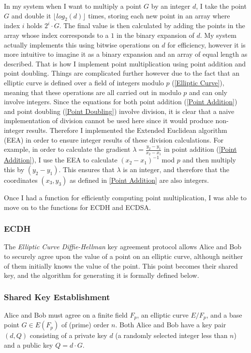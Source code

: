 \documentclass[12pt,a4paper]{article}
\begin{document}
In my system when I want to multiply a point $G$ by an integer $d$, 
I take the point $G$ and double it $\lfloor log_2(d) \rfloor$ times, storing each new point in an array where index $i$ holds $2^i \cdot G$. 
The final value is then calculated by adding the points in the array whose index corresponds to a $1$ in the binary expansion of $d$. 
My system actually implements this using bitwise operations on $d$ for efficiency, 
however it is more intuitive to imagine it as a binary expansion and an array of equal length as described. 
That is how I implement point multiplication using point addition and point doubling. 
Things are complicated further however due to the fact that an elliptic curve is defined over a field of integers modulo $p$ (\ref{Elliptic Curve}), 
meaning that these operations are all carried out in modulo $p$ and can only involve integers. 
Since the equations for both point addition (\ref{Point Addition}) and point doubling (\ref{Point Doubling}) involve division, 
it is clear that a naive implementation of division cannot be used here since it would produce non-integer results. 
Therefore I implemented the Extended Euclidean algorithm (EEA) in order to ensure integer results of these division calculations. 
For example, in order to calculate the gradient $\lambda = \frac{y_2-y_1}{x_2-x_1}$ in point addition (\ref{Point Addition}), 
I use the EEA to calculate $(x_2-x_1)^{-1}$ mod $p$ and then multiply this by $(y_2-y_1)$. 
This ensures that $\lambda$ is an integer, and therefore that the coordinates $(x_3,y_3)$ as defined in \ref{Point Addition} 
are also integers. 

Once I had a function for efficiently computing point multiplication, I was able to move on to the functions for ECDH and ECDSA. 

\subsubsection{ECDH} \noindent \label{ECDH}
The \emph{Elliptic Curve Diffie-Hellman} key agreement protocol allows Alice and Bob 
to securely agree upon the value of a point on an elliptic curve, although neither of them initially knows the value of the point. 
This point becomes their shared key, and the algorithm for generating it is formally defined below. 


\subsubsection{Shared Key Establishment} \noindent \label{SharedKey}
Alice and Bob must agree on a finite field $F_p$, an elliptic curve $E/F_p$, and a base point $G \in E(F_p)$  of (prime) order $n$.
Both Alice and Bob have a key pair $(d,Q)$ consisting of a private key $d$ (a randomly selected integer less than $n$) 
and a public key $Q = d \cdot G$.
\end{document}
